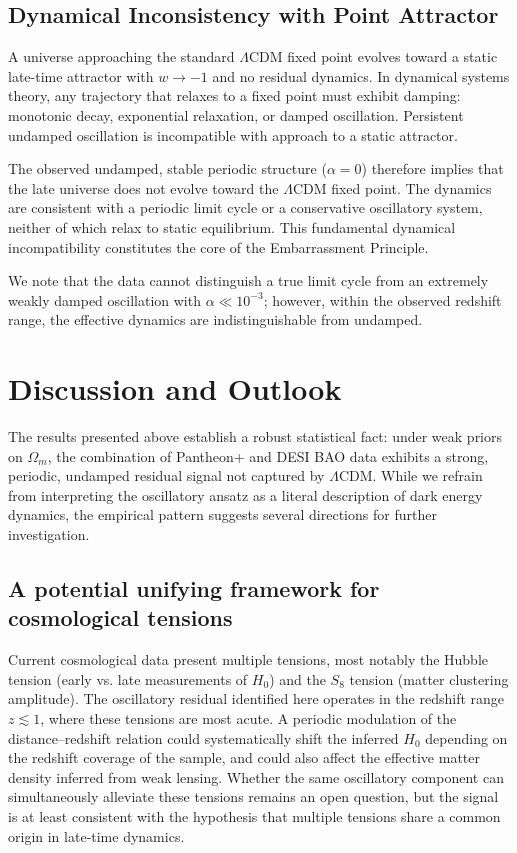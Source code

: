 \documentclass[10pt,a4paper,twocolumn]{article}
\begin{document}
\subsection{Dynamical Inconsistency with Point Attractor}
A universe approaching the standard $\Lambda$CDM fixed point evolves toward a static late-time attractor with $w\to -1$ and no residual dynamics.
In dynamical systems theory, any trajectory that relaxes to a fixed point must exhibit damping:
monotonic decay, exponential relaxation, or damped oscillation.
Persistent undamped oscillation is incompatible with approach to a static attractor.

The observed undamped, stable periodic structure ($\alpha=0$) therefore implies that
the late universe does not evolve toward the $\Lambda$CDM fixed point.
The dynamics are consistent with a periodic limit cycle or a conservative oscillatory system,
neither of which relax to static equilibrium.
This fundamental dynamical incompatibility constitutes the core of the Embarrassment Principle.

We note that the data cannot distinguish a true limit cycle from an extremely weakly damped oscillation with $\alpha\ll 10^{-3}$;
however, within the observed redshift range, the effective dynamics are indistinguishable from undamped.

\section{Discussion and Outlook}
The results presented above establish a robust statistical fact: under weak priors on $\Omega_m$, the combination of Pantheon+ and DESI BAO data exhibits a strong, periodic, undamped residual signal not captured by $\Lambda$CDM. While we refrain from interpreting the oscillatory ansatz as a literal description of dark energy dynamics, the empirical pattern suggests several directions for further investigation.

\subsection{A potential unifying framework for cosmological tensions}
Current cosmological data present multiple tensions, most notably the Hubble tension (early vs. late measurements of $H_0$) and the $S_8$ tension (matter clustering amplitude). The oscillatory residual identified here operates in the redshift range $z\lesssim1$, where these tensions are most acute. A periodic modulation of the distance–redshift relation could systematically shift the inferred $H_0$ depending on the redshift coverage of the sample, and could also affect the effective matter density inferred from weak lensing. Whether the same oscillatory component can simultaneously alleviate these tensions remains an open question, but the signal is at least consistent with the hypothesis that multiple tensions share a common origin in late‑time dynamics.
\end{document}
